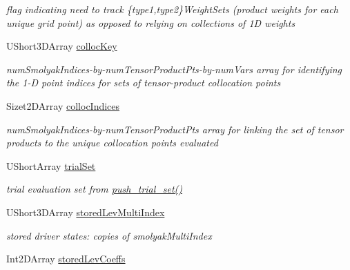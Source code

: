 \begin{DoxyCompactItemize}
\begin{DoxyCompactList}\small\item\em flag indicating need to track \{type1,type2\}Weight\+Sets (product weights for each unique grid point) as opposed to relying on collections of 1D weights \end{DoxyCompactList}\item 
U\+Short3\+D\+Array \hyperlink{classPecos_1_1CombinedSparseGridDriver_a7ac9c2c5db5ccae11777de146f4c487c}{colloc\+Key}\label{classPecos_1_1CombinedSparseGridDriver_a7ac9c2c5db5ccae11777de146f4c487c}

\begin{DoxyCompactList}\small\item\em num\+Smolyak\+Indices-\/by-\/num\+Tensor\+Product\+Pts-\/by-\/num\+Vars array for identifying the 1-\/D point indices for sets of tensor-\/product collocation points \end{DoxyCompactList}\item 
Sizet2\+D\+Array \hyperlink{classPecos_1_1CombinedSparseGridDriver_a91e029d1d2775255b8a3a6604cfbe9e3}{colloc\+Indices}\label{classPecos_1_1CombinedSparseGridDriver_a91e029d1d2775255b8a3a6604cfbe9e3}

\begin{DoxyCompactList}\small\item\em num\+Smolyak\+Indices-\/by-\/num\+Tensor\+Product\+Pts array for linking the set of tensor products to the unique collocation points evaluated \end{DoxyCompactList}\item 
U\+Short\+Array \hyperlink{classPecos_1_1CombinedSparseGridDriver_a54f1421879a8436a667a6a4adba11dd0}{trial\+Set}\label{classPecos_1_1CombinedSparseGridDriver_a54f1421879a8436a667a6a4adba11dd0}

\begin{DoxyCompactList}\small\item\em trial evaluation set from \hyperlink{classPecos_1_1CombinedSparseGridDriver_a99c17efb3a8e873b7708652cc1787370}{push\+\_\+trial\+\_\+set()} \end{DoxyCompactList}\item 
U\+Short3\+D\+Array \hyperlink{classPecos_1_1CombinedSparseGridDriver_a217244fba426bff265ede66abaab32f5}{stored\+Lev\+Multi\+Index}\label{classPecos_1_1CombinedSparseGridDriver_a217244fba426bff265ede66abaab32f5}

\begin{DoxyCompactList}\small\item\em stored driver states\+: copies of smolyak\+Multi\+Index \end{DoxyCompactList}\item 
Int2\+D\+Array \hyperlink{classPecos_1_1CombinedSparseGridDriver_a85706753e4a3ddabba327d695082f3a7}{stored\+Lev\+Coeffs}\label{classPecos_1_1CombinedSparseGridDriver_a85706753e4a3ddabba327d695082f3a7}


\end{DoxyCompactItemize}
